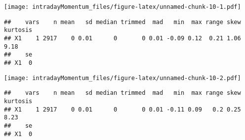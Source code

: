 \documentclass[]{article}
\newenvironment{Shaded}{\begin{snugshade}}{\end{snugshade}}
\newcommand{\KeywordTok}[1]{\textcolor[rgb]{0.13,0.29,0.53}{\textbf{#1}}}
\newcommand{\NormalTok}[1]{#1}
\newcommand{\OperatorTok}[1]{\textcolor[rgb]{0.81,0.36,0.00}{\textbf{#1}}}
\newcommand{\StringTok}[1]{\textcolor[rgb]{0.31,0.60,0.02}{#1}}
\begin{document}
\texttt{[image: intradayMomentum\_files/figure-latex/unnamed-chunk-10-1.pdf]}

\begin{Shaded}
\end{Shaded}

\begin{verbatim}
##    vars    n mean   sd median trimmed  mad   min  max range skew kurtosis
## X1    1 2917    0 0.01      0       0 0.01 -0.09 0.12  0.21 1.06     9.18
##    se
## X1  0
\end{verbatim}

\begin{Shaded}
\end{Shaded}

\texttt{[image: intradayMomentum\_files/figure-latex/unnamed-chunk-10-2.pdf]}

\begin{Shaded}
\end{Shaded}

\begin{verbatim}
##    vars    n mean   sd median trimmed  mad   min  max range skew kurtosis
## X1    1 2917    0 0.01      0       0 0.01 -0.11 0.09   0.2 0.25     8.23
##    se
## X1  0
\end{verbatim}

\begin{Shaded}
\end{Shaded}
\end{document}
